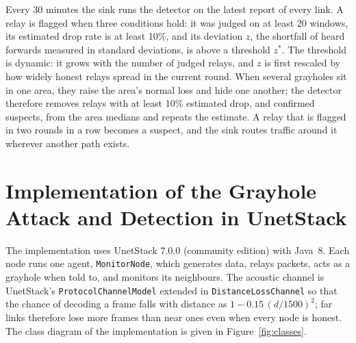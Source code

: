 \documentclass[conference]{IEEEtran}
\begin{document}
Every 30 minutes the sink runs the detector on the latest report of every link. A relay is flagged when three conditions hold: it was judged on at least 20 windows, its estimated drop rate is at least 10\%, and its deviation $z$, the shortfall of heard forwards measured in standard deviations, is above a threshold $z^*$. The threshold is dynamic: it grows with the number of judged relays, and $z$ is first rescaled by how widely honest relays spread in the current round. When several grayholes sit in one area, they raise the area's normal loss and hide one another; the detector therefore removes relays with at least 10\% estimated drop, and confirmed suspects, from the area medians and repeats the estimate. A relay that is flagged in two rounds in a row becomes a suspect, and the sink routes traffic around it wherever another path exists.

\section{Implementation of the Grayhole Attack and Detection in UnetStack}\label{sec:impl}
The implementation uses UnetStack 7.0.0 (community edition) with Java~8. Each node runs one agent, \texttt{MonitorNode}, which generates data, relays packets, acts as a grayhole when told to, and monitors its neighbours. The acoustic channel is UnetStack's \texttt{ProtocolChannelModel} extended in \texttt{DistanceLossChannel} so that the chance of decoding a frame falls with distance as $1-0.15\,(d/1500)^2$; far links therefore lose more frames than near ones even when every node is honest. The class diagram of the implementation is given in Figure~\ref{fig:classes}.
\end{document}
